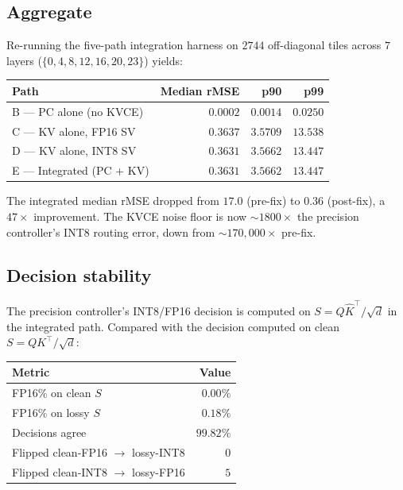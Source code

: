 \documentclass[11pt]{article}
\begin{document}
\subsection{Aggregate}

Re-running the five-path integration harness on $2744$ off-diagonal
tiles across $7$ layers ($\{0,4,8,12,16,20,23\}$) yields:

\begin{center}
\renewcommand{\arraystretch}{1.15}
\begin{tabular}{@{}lrrr@{}}
\toprule
Path & Median rMSE & p90 & p99 \\
\midrule
B --- PC alone (no KVCE)    & $0.0002$ & $0.0014$ & $0.0250$ \\
C --- KV alone, FP16 SV     & $0.3637$ & $3.5709$ & $13.538$ \\
D --- KV alone, INT8 SV     & $0.3631$ & $3.5662$ & $13.447$ \\
E --- Integrated (PC + KV)  & $0.3631$ & $3.5662$ & $13.447$ \\
\bottomrule
\end{tabular}
\end{center}

The integrated median rMSE dropped from $17.0$ (pre-fix) to $0.36$
(post-fix), a $47\times$ improvement. The KVCE noise floor is now
$\sim 1800\times$ the precision controller's INT8 routing error,
down from $\sim 170{,}000\times$ pre-fix.

\subsection{Decision stability}

The precision controller's INT8/FP16 decision is computed on
$S = Q\hat K^\top / \sqrt{d}$ in the integrated path. Compared
with the decision computed on clean $S = Q K^\top / \sqrt{d}$:

\begin{center}
\renewcommand{\arraystretch}{1.15}
\begin{tabular}{@{}lr@{}}
\toprule
Metric & Value \\
\midrule
FP16\% on clean $S$ & $0.00\%$ \\
FP16\% on lossy $S$ & $0.18\%$ \\
Decisions agree & $99.82\%$ \\
Flipped clean-FP16 $\rightarrow$ lossy-INT8 & $0$ \\
Flipped clean-INT8 $\rightarrow$ lossy-FP16 & $5$ \\
\bottomrule
\end{tabular}
\end{center}
\end{document}
